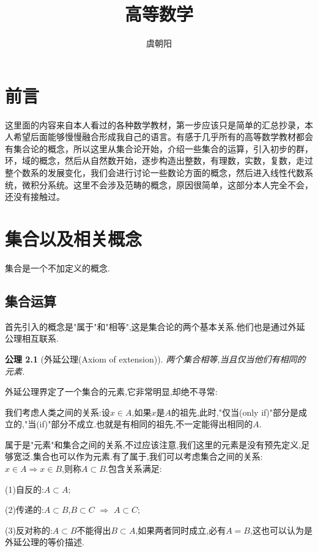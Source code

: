 \documentclass[12pt,a4paper,openany]{book}
\title{高等数学}
\author{虞朝阳}
\newtheorem{axiom}{公理}[section]
\begin{document}
\frontmatter
\frontmatter
\begin{titlepage}
\maketitle
\end{titlepage}
\setcounter{page}{0}
\chapter{前言}
这里面的内容来自本人看过的各种数学教材，第一步应该只是简单的汇总抄录，本人希望后面能够慢慢融合形成我自己的语言。有感于几乎所有的高等数学教材都会有集合论的概念，所以这里从集合论开始，介绍一些集合的运算，引入初步的群，环，域的概念，然后从自然数开始，逐步构造出整数，有理数，实数，复数，走过整个数系的发展变化，我们会进行讨论一些数论方面的概念，然后进入线性代数系统，微积分系统。这里不会涉及范畴的概念，原因很简单，这部分本人完全不会，还没有接触过。


\tableofcontents

\mainmatter
\chapter{集合以及相关概念}
集合是一个不加定义的概念.

\section{集合运算}
首先引入的概念是"属于"和"相等",这是集合论的两个基本关系.他们也是通过外延公理相互联系.

\begin{axiom}[外延公理(Axiom of extension)]
两个集合相等,当且仅当他们有相同的元素.
\end{axiom}

外延公理界定了一个集合的元素,它非常明显,却绝不寻常:

我们考虑人类之间的关系:设$x \in A$,如果$x$是$A$的祖先,此时,"仅当(only if)"部分是成立的,"当(if)"部分不成立.也就是有相同的祖先,不一定能得出相同的$A$.

属于是"元素"和集合之间的关系,不过应该注意,我们这里的元素是没有预先定义,足够宽泛.集合也可以作为元素.有了属于,我们可以考虑集合之间的关系:$x \in A \Rightarrow x \in B$,则称$A \subset B$.包含关系满足:

(1)自反的:$A \subset A$;

(2)传递的:$A \subset B$,$B \subset C$ $\Rightarrow$ $A \subset C$;

(3)反对称的:$A \subset B$不能得出$B \subset A$,如果两者同时成立,必有$A = B$,这也可以认为是外延公理的等价描述.
\end{document}
